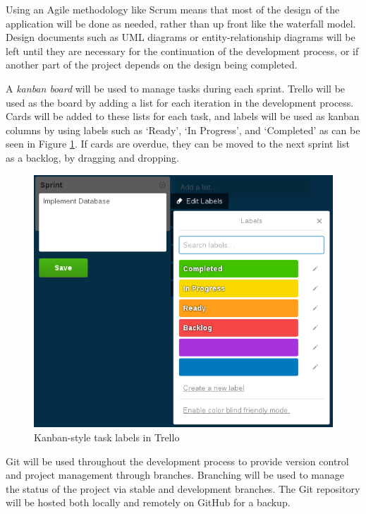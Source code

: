 \documentclass[a4paper, 12pt]{article}
\begin{document}

Using an Agile methodology like Scrum means that most of the design of the application will be done as needed, rather than up front like the waterfall model. Design documents such as UML diagrams or entity-relationship diagrams will be left until they are necessary for the continuation of the development process, or if another part of the project depends on the design being completed.

A \emph{kanban board} will be used to manage tasks during each sprint. Trello will be used as the board by adding a list for each iteration in the development process. Cards will be added to these lists for each task, and labels will be used as kanban columns by using labels such as `Ready', `In Progress', and `Completed' as can be seen in Figure \ref{fig:kanban}. If cards are overdue, they can be moved to the next sprint list as a backlog, by dragging and dropping.


\begin{figure}[h]
	\centering
	\includegraphics[scale=0.7]{kanban}
	\caption{Kanban-style task labels in Trello}
	\label{fig:kanban}
\end{figure}

Git will be used throughout the development process to provide version control and project management through branches. Branching will be used to manage the status of the project via stable and development branches. The Git repository will be hosted both locally and remotely on GitHub for a backup.
\end{document}
